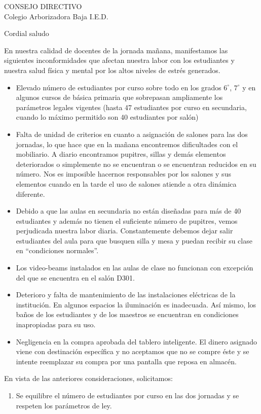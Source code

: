\documentclass[spanish,11pt]{letter}
\date{27 de febrero de 2015}
\begin{document}
\begin{letter}{CONSEJO DIRECTIVO\\Colegio Arborizadora Baja I.E.D.}
	
\opening{Cordial saludo}
En nuestra calidad de docentes de la jornada mañana, manifestamos las siguientes inconformidades que afectan nuestra labor con los estudiantes y nuestra salud física y mental por los altos niveles de estr\'{e}s generados.
\begin{itemize}
\item Elevado n\'{u}mero de estudiantes por curso sobre todo en los grados $6^{\circ}$, $7^{\circ}$ y en algunos cursos de básica primaria que sobrepasan ampliamente los par\'{a}metros legales vigentes (hasta 47 estudiantes por curso en secundaria, cuando lo m\'{a}ximo permitido son 40 estudiantes por sal\'{o}n)
\item Falta de unidad de criterios en cuanto a asignación de salones para las dos jornadas, lo que hace que en la mañana encontremos dificultades con el mobiliario. A diario encontramos pupitres, sillas y demás elementos deteriorados o simplemente no se encuentran o se encuentran reducidos en su número. Nos es imposible hacernos responsables por los salones y sus elementos cuando en la tarde el uso de salones atiende a otra dinámica diferente.
\item Debido a que las aulas en secundaria no están diseñadas para más de 40 estudiantes y además no tienen el suficiente número de pupitres, vemos perjudicada nuestra labor diaria. Constantemente debemos dejar salir estudiantes del aula para que busquen silla y mesa y puedan recibir su clase en ``condiciones normales''.
\item Los video-beams instalados en las aulas de clase no funcionan con excepción del que se encuentra en el salón D301.
\item Deterioro y falta de mantenimiento de las instalaciones eléctricas de la institución. En algunos espacios la iluminación es inadecuada. Así mismo, los baños de los estudiantes y de los maestros se encuentran en condiciones inapropiadas para su uso.
\item Negligencia en la compra aprobada del tablero inteligente. El dinero asignado viene con destinación específica y no aceptamos que no se compre éste y se intente reemplazar su compra por una pantalla que reposa en almacén.
\end{itemize}
En vista de las anteriores consideraciones, solicitamos: 
\begin{enumerate}
\item Se equilibre el número de estudiantes por curso en las dos jornadas y se respeten los parámetros de ley.

\end{enumerate}
\end{letter}
\end{document}
